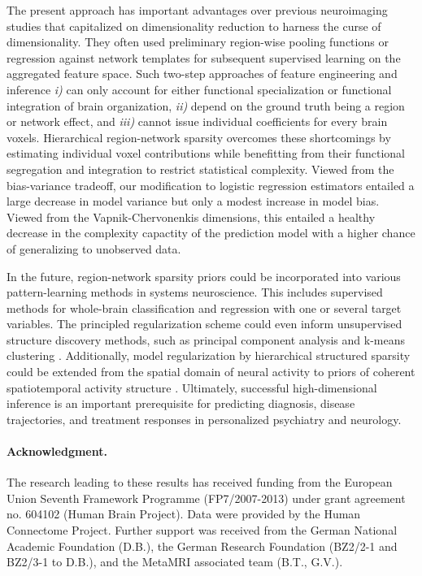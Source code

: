 \documentclass{article} %
\begin{document}
The present approach has important advantages over previous
neuroimaging studies that capitalized on dimensionality reduction to harness
the curse of dimensionality.
They often used preliminary region-wise pooling functions
or regression against network templates
for subsequent supervised learning on the aggregated feature space.
Such two-step approaches of feature engineering and inference
\textit{i)} can only account for either functional specialization or
functional integration of brain organization,
\textit{ii)} depend on the ground truth being a region or network effect,
and
\textit{iii)} cannot issue individual coefficients for every brain voxels.
%
Hierarchical region-network sparsity overcomes these shortcomings
by estimating individual voxel contributions
while benefitting from their functional segregation and integration
to restrict statistical complexity.
%
Viewed from the bias-variance tradeoff,
our modification to logistic regression estimators
entailed a large decrease in model variance but only a modest
increase in model bias.
Viewed from the Vapnik-Chervonenkis dimensions,
this entailed a healthy decrease in the complexity capactity of the prediction model
with a higher chance of generalizing to unobserved data.



In the future,
region-network sparsity priors could be incorporated into various
pattern-learning methods in systems neuroscience.
%
This includes supervised methods for whole-brain classification and regression
with one or several target variables.
The principled regularization scheme could even inform
unsupervised structure discovery methods,
such as principal component analysis
\cite{jenatton2009structured}
and
k-means clustering \cite{witten2010framework}.
%
Additionally,
model regularization by hierarchical structured sparsity could be extended
from the spatial domain of neural activity to
priors of coherent spatiotemporal activity structure
\cite{gramfort2011tracking}.
%
Ultimately,
successful high-dimensional inference is
an important prerequisite
for predicting diagnosis,
disease trajectories, and treatment responses
in personalized psychiatry and neurology.



\paragraph{Acknowledgment.}
{\small The research leading to these results has received funding from the
European Union Seventh Framework Programme (FP7/2007-2013)
under grant agreement no. 604102 (Human Brain Project).
Data were provided by the Human Connectome Project.
Further support was received from
the German National Academic Foundation (D.B.),
the German Research Foundation (BZ2/2-1 and BZ2/3-1 to D.B.),
and the MetaMRI associated team (B.T., G.V.).
}

  
\small
% 


\end{document}
